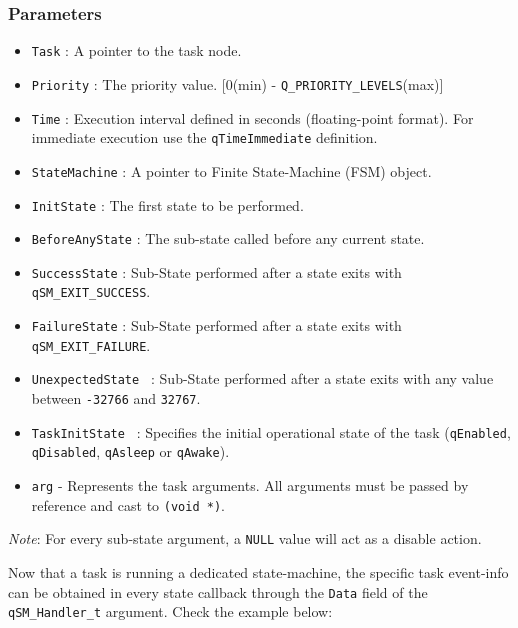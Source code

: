\documentclass{article}
\begin{document}
\subsubsection*{Parameters}
\begin{itemize}
    \item \lstinline{Task} : A pointer to the task node. 
    \item \lstinline{Priority} : The priority value. [0(min) - \lstinline{Q_PRIORITY_LEVELS}(max)]
    \item \lstinline{Time} : Execution interval defined in seconds (floating-point format). For immediate execution use the  \lstinline{qTimeImmediate} definition. 
    \item \lstinline{StateMachine} : A pointer to Finite State-Machine (FSM) object.
    \item \lstinline{InitState} :  The first state to be performed. 
    \item \lstinline{BeforeAnyState} :  The sub-state called before any current state.
    \item \lstinline{SuccessState} :  Sub-State performed after a state exits with \lstinline{qSM_EXIT_SUCCESS}.
    \item \lstinline{FailureState} :  Sub-State performed after a state exits with \lstinline{qSM_EXIT_FAILURE}.
    \item \lstinline{UnexpectedState } : Sub-State performed after a state exits with any value between \lstinline{-32766} and \lstinline{32767}.      
    \item \lstinline{TaskInitState } : Specifies the initial operational state of the task (\lstinline{qEnabled}, \lstinline{qDisabled}, \lstinline{qAsleep} or \lstinline{qAwake}).
    \item \lstinline{arg} - Represents the task arguments. All arguments must be passed by reference and cast to \lstinline{(void *)}. 
\end{itemize}

\begin{tcolorbox}
\ArrowBoldDownRight \textit{Note}: For every sub-state argument, a \lstinline{NULL} value will act as a disable action.
\end{tcolorbox}

Now that a task is running a dedicated state-machine, the specific task event-info can be obtained in every state callback through the \lstinline{Data} field of the \lstinline{qSM_Handler_t} argument. Check the example below: \\
\end{document}
